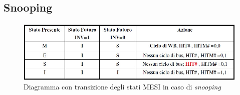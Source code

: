 \subsection{Snooping}
\label{sec:accessoSnooping}

\begin{figure}[!h]
\centering
\includegraphics[width=0.75\columnwidth]{img/transSnooping}
\caption{Diagramma con transizione degli stati MESI in caso di \textit{snooping}}
\label{fig:transSnooping}
\end{figure}

